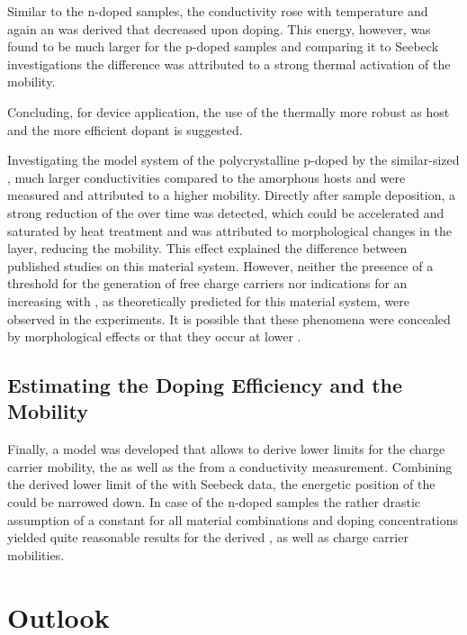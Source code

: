 Similar to the n-doped samples, the conductivity rose with temperature and again an \EactLongL was derived that decreased upon doping. This energy, however, was found to be much larger for the p-doped samples and comparing it to Seebeck investigations the difference was attributed to a strong thermal activation of the mobility.

Concluding, for device application, the use of the thermally more robust \lili as host and the more efficient dopant \FS is suggested.

Investigating the model system of the polycrystalline \pen p-doped by the similar-sized \FV, much larger conductivities compared to the amorphous hosts \meo and \lili were measured and attributed to a higher mobility.
Directly after sample deposition, a strong reduction of the \insitu \cLong over time was detected, which could be accelerated and saturated by heat treatment and was attributed to morphological changes in the layer, reducing the mobility. This effect explained the difference between published studies on this material system.
However, neither the presence of a threshold \CLong for the generation of free charge carriers nor indications for an increasing \DopEffLong with \CLong, as theoretically predicted for this material system, were observed in the experiments.
It is possible that these phenomena were concealed by morphological effects or that they occur at lower \CLongs.

\subsection*{Estimating the Doping Efficiency and the Mobility}
Finally, a model was developed that allows to derive lower limits for the charge carrier mobility, the \nLong as well as the \DopEffLong from a conductivity measurement. 
Combining the derived lower limit of the \DopEffLong with Seebeck data, the energetic position of the \EtLong could be narrowed down.
In case of the n-doped \CS samples the rather drastic assumption of a constant \EtLong for all material combinations and doping concentrations yielded quite reasonable results for the derived \neLongs, \DopEffLongs as well as charge carrier mobilities.

\section{Outlook}

